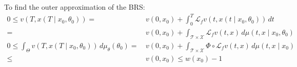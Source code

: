 \documentclass[10pt]{scrartcl}
\theoremstyle{remark}
\providecommand{\ip}[1]{\ensuremath \langle #1\rangle}
\begin{document}
To find the outer approximation of the BRS:
\begin{align}
0\le v(T,x(T\mid x_0,\theta_0))=&\,v(0,x_0)+\int_{0}^T\mathcal L_fv(t,x(t\mid x_0,\theta_0))\,dt\\
=&\,v(0,x_0)+\int_{\mathcal T\times \mathcal X}\mathcal L_fv(t,x)\,d\mu(t,x\mid x_0,\theta_0)\\
0\le \int_{\Theta}v(T,x(T\mid x_0,\theta_0))\,d\mu_\theta(\theta_0)=&\,v(0,x_0)+\int_{\mathcal T\times \mathcal X}\Phi\circ \mathcal L_fv(t,x)\,d\mu(t,x\mid x_0)\\
\le &\,v(0,x_0)\le w(x_0)-1
\end{align}
\end{document}
